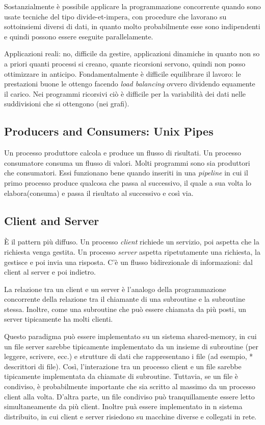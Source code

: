 \documentclass[10pt,a4paper]{article}
\begin{document}
Sostanzialmente è possibile applicare la programmazione concorrente quando sono usate tecniche del tipo divide-et-impera, con procedure che lavorano su sottoinsiemi diversi di dati, in quanto molto probabilmente esse sono indipendenti e quindi possono essere eseguite parallelamente.

Applicazioni reali: no, difficile da gestire, applicazioni dinamiche in quanto non so a priori quanti processi si creano, quante ricorsioni servono, quindi non posso ottimizzare in anticipo.
Fondamentalmente è difficile equilibrare il lavoro: le prestazioni buone le ottengo facendo \textit{load balancing} ovvero dividendo equamente il carico. Nei programmi ricorsivi ciò è difficile per la variabilità dei dati nelle suddivisioni che si ottengono (nei grafi).

\subsection{Producers and Consumers: Unix Pipes}
Un processo produttore calcola e produce un flusso di risultati. Un processo consumatore consuma un flusso di valori. Molti programmi sono sia produttori che consumatori. Essi funzionano bene quando inseriti in una \textit{pipeline} in cui il primo processo produce qualcosa che passa al successivo, il quale a sua volta lo elabora(consuma) e passa il risultato al successivo e così via.


\subsection{Client and Server}
\`{E} il pattern più diffuso. Un processo \textit{client} richiede un servizio, poi aspetta che la richiesta venga gestita. Un processo \textit{server} aspetta ripetutamente una richiesta, la gestisce e poi invia una risposta. C'è un flusso bidirezionale di informazioni: dal client al server e poi indietro.

La relazione tra un client e un server è l'analogo della programmazione concorrente della relazione tra il chiamante di una subroutine e la subroutine stessa. Inoltre, come una subroutine che può essere chiamata da più posti, un server tipicamente ha molti clienti.

Questo paradigma può essere implementato su un sistema shared-memory, in cui un file server sarebbe tipicamente implementato da un insieme di subroutine (per leggere, scrivere, ecc.) e strutture di dati che rappresentano i file (ad esempio, * descrittori di file). Così, l'interazione tra un processo client e un file sarebbe tipicamente implementata da chiamate di subroutine. Tuttavia, se un file è condiviso, è probabilmente importante che sia scritto al massimo da un processo client alla volta. D'altra parte, un file condiviso può tranquillamente essere letto simultaneamente da più client.
Inoltre puà essere implementato in n sistema distribuito, in cui client e server risiedono su macchine diverse e collegati in rete.
\end{document}
